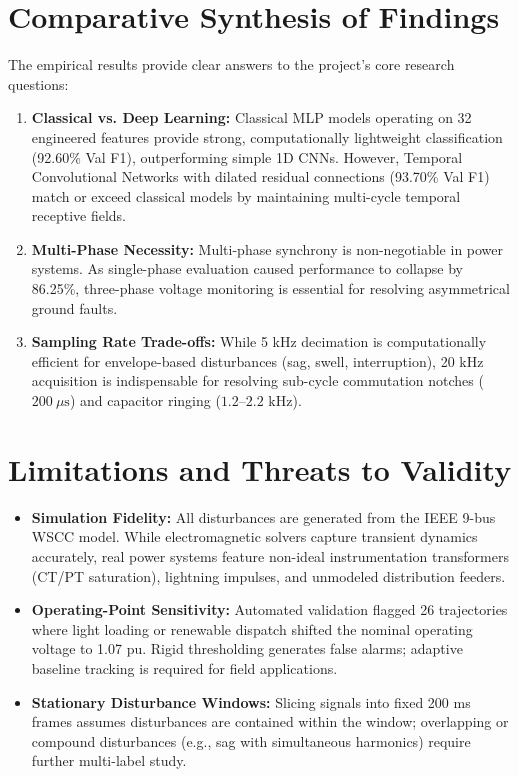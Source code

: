 \documentclass[12pt,a4paper]{report}
\begin{document}
\section{Comparative Synthesis of Findings}
The empirical results provide clear answers to the project's core research questions:
\begin{enumerate}
    \item \textbf{Classical vs. Deep Learning:} Classical MLP models operating on 32 engineered features provide strong, computationally lightweight classification (92.60\% Val F1), outperforming simple 1D CNNs. However, Temporal Convolutional Networks with dilated residual connections (93.70\% Val F1) match or exceed classical models by maintaining multi-cycle temporal receptive fields.
    \item \textbf{Multi-Phase Necessity:} Multi-phase synchrony is non-negotiable in power systems. As single-phase evaluation caused performance to collapse by 86.25\%, three-phase voltage monitoring is essential for resolving asymmetrical ground faults.
    \item \textbf{Sampling Rate Trade-offs:} While 5 kHz decimation is computationally efficient for envelope-based disturbances (sag, swell, interruption), 20 kHz acquisition is indispensable for resolving sub-cycle commutation notches ($200\ \mu\text{s}$) and capacitor ringing ($1.2\text{--}2.2\text{ kHz}$).
\end{enumerate}

\section{Limitations and Threats to Validity}
\begin{itemize}
    \item \textbf{Simulation Fidelity:} All disturbances are generated from the IEEE 9-bus WSCC model. While electromagnetic solvers capture transient dynamics accurately, real power systems feature non-ideal instrumentation transformers (CT/PT saturation), lightning impulses, and unmodeled distribution feeders.
    \item \textbf{Operating-Point Sensitivity:} Automated validation flagged 26 trajectories where light loading or renewable dispatch shifted the nominal operating voltage to 1.07 pu. Rigid thresholding generates false alarms; adaptive baseline tracking is required for field applications.
    \item \textbf{Stationary Disturbance Windows:} Slicing signals into fixed 200 ms frames assumes disturbances are contained within the window; overlapping or compound disturbances (e.g., sag with simultaneous harmonics) require further multi-label study.
\end{itemize}
\end{document}
